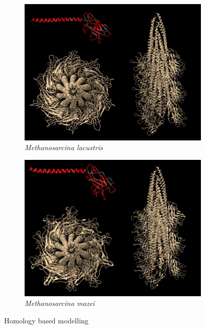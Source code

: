 \documentclass[fontsize=12pt,headsepline=true, bibliography=totocnumbered, twoside]{scrbook} %
\begin{document}
\begin{figure}
\begin{subfigure}{.5\textwidth}
  \centering
  \includegraphics[width=.9\linewidth]{lacustris}  
  \caption{\textit{Methanosarcina lacustris}}
  
\end{subfigure}
\begin{subfigure}{.5\textwidth}
  \centering
  \includegraphics[width=.9\linewidth]{mazei}  
  \caption{\textit{Methanosarcina mazei}}
  
\end{subfigure}
\caption{Homology based modelling}
\label{homology}
\end{figure}
\end{document}
